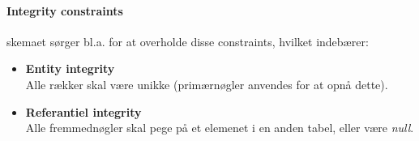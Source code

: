 \paragraph{Integrity constraints} skemaet sørger bl.a. for at overholde disse constraints, hvilket indebærer:

\begin{itemize}
	\item \textbf{Entity integrity}\\
	Alle rækker skal være unikke (primærnøgler anvendes for at opnå dette).
	\item \textbf{Referantiel integrity}\\
	Alle fremmednøgler skal pege på et elemenet i en anden tabel, eller være \textit{null}.
\end{itemize}
